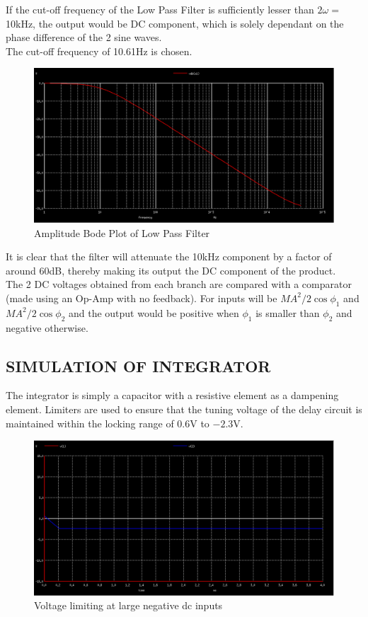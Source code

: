 \documentclass[10pt, conference]{IEEEtran}
\begin{document}
If the cut-off frequency of the Low Pass Filter is sufficiently lesser than $2\omega =$10kHz, the output would be DC component, which is solely dependant on the phase difference of the 2 sine waves.\\
The cut-off frequency of 10.61Hz is chosen.
\begin{figure}[bhp]
\includegraphics[width=\columnwidth]{LPF_AmpBodePlot.PNG}
\caption{Amplitude Bode Plot of Low Pass Filter}
\label{LPF_bode}
\end{figure}
It is clear that the filter will attenuate the 10kHz component by a factor of around 60dB, thereby making its output the DC component of the product.\\

The 2 DC voltages obtained from each branch are compared with a comparator (made using an Op-Amp with no feedback). For inputs will be $MA^2/2\cos{\phi_1}$ and $MA^2/2\cos{\phi_2}$ and the output would be positive when $\phi_1$ is smaller than $\phi_2$ and negative otherwise.

\subsection{SIMULATION OF INTEGRATOR}
The integrator is simply a capacitor with a resistive element as a dampening element. Limiters are used to ensure that the tuning voltage of the delay circuit is maintained within the locking range of 0.6V to $-2.3$V. 

\begin{figure}[bhp]
\centering
\includegraphics[width=\columnwidth]{int_Negative.PNG}
\caption{Voltage limiting at large negative dc inputs}
\label{int_neg}
\end{figure}
\end{document}

